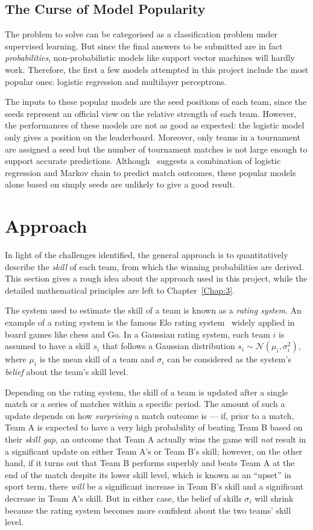 \subsection{The Curse of Model Popularity}
The problem to solve can be categorised as a classification problem under supervised learning. But since the final answers to be submitted are in fact \emph{probabilities}, non-probabilistic models like support vector machines will hardly work. Therefore, the first a few models attempted in this project include the most popular ones: logistic regression and multilayer perceptrons. 

The inputs to these popular models are the seed positions of each team, since the seeds represent an official view on the relative strength of each team. However, the performances of these models are not as good as expected: the logistic model only gives a  position on the leaderboard. Moreover, only teams in a tournament are assigned a seed but the number of tournament matches is not large enough to support accurate predictions. Although~\cite{PJ06} suggests a combination of logistic regression and Markov chain to predict match outcomes, these popular models alone based on simply seeds are unlikely to give a good result. 

\section{Approach}\label{Sec: approach}
In light of the challenges identified, the general approach is to quantitatively describe the \emph{skill} of each team, from which the winning probabilities are derived. This section gives a rough idea about the approach used in this project, while the detailed mathematical principles are left to Chapter~\ref{Chap:3}. 

The system used to estimate the skill of a team is known as a \emph{rating system}. An example of a rating system is the famous Elo rating system~\cite{AE78} widely applied in board games like chess and Go. In a Gaussian rating system, each team $i$ is assumed to have a skill $s_{i}$ that follows a Gaussian distribution $s_{i} \sim \mathcal{N}(\mu_{i}, \sigma_{i}^{2})$, where $\mu_{i}$ is the mean skill of a team and $\sigma_{i}$ can be considered as the system's \emph{belief} about the team's skill level. 

Depending on the rating system, the skill of a team is updated after a single match or a series of matches within a specific period. The amount of such a update depends on how \emph{surprising} a match outcome is --- if, prior to a match, Team A is expected to have a very high probability of beating Team B based on their \emph{skill gap}, an outcome that Team A actually wins the game will \emph{not} result in a significant update on either Team A's or Team B's skill; however, on the other hand, if it turns out that Team B performs superbly and beats Team A at the end of the match despite its lower skill level, which is known as an ``upset'' in sport term, there \emph{will} be a significant increase in Team B's skill and a significant decrease in Team A's skill. But in either case, the belief of skills $\sigma_{i}$ will shrink because the rating system becomes more confident about the two teams' skill level. 

